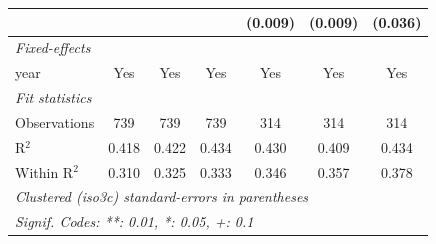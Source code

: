 \begin{tabular}{lcccccc}
                                          &                                             &                           &                               & (0.009)                                     & (0.009)                   & (0.036)\\   
   \midrule
   \emph{Fixed-effects}\\
   year                                   & Yes                                         & Yes                       & Yes                           & Yes                                         & Yes                       & Yes\\  
   \midrule
   \emph{Fit statistics}\\
   Observations                           & 739                                         & 739                       & 739                           & 314                                         & 314                       & 314\\  
   R$^2$                                  & 0.418                                       & 0.422                     & 0.434                         & 0.430                                       & 0.409                     & 0.434\\  
   Within R$^2$                           & 0.310                                       & 0.325                     & 0.333                         & 0.346                                       & 0.357                     & 0.378\\  
   \midrule \midrule
   \multicolumn{7}{l}{\emph{Clustered (iso3c) standard-errors in parentheses}}\\
   \multicolumn{7}{l}{\emph{Signif. Codes: **: 0.01, *: 0.05, +: 0.1}}\\
\end{tabular}
\par\endgroup


